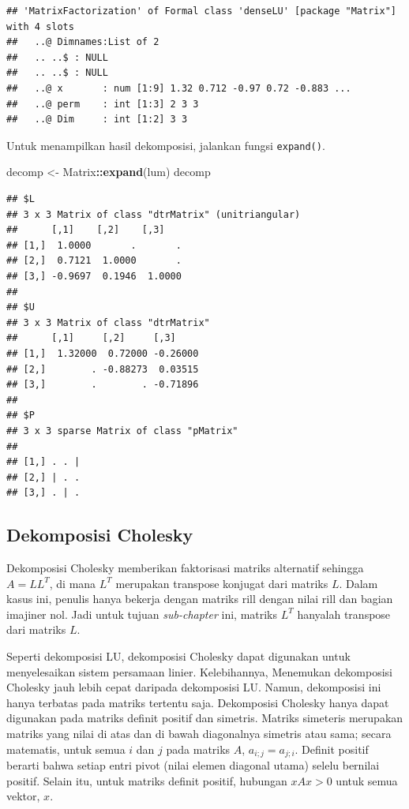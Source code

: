 \documentclass[
]{book}
\newenvironment{Shaded}{\begin{snugshade}}{\end{snugshade}}
\newcommand{\FunctionTok}[1]{\textcolor[rgb]{0.13,0.29,0.53}{\textbf{#1}}}
\newcommand{\NormalTok}[1]{#1}
\newcommand{\OtherTok}[1]{\textcolor[rgb]{0.56,0.35,0.01}{#1}}
\newcommand{\SpecialCharTok}[1]{\textcolor[rgb]{0.81,0.36,0.00}{\textbf{#1}}}
\theoremstyle{definition}
\theoremstyle{definition}
\theoremstyle{definition}
\theoremstyle{definition}
\theoremstyle{remark}
\begin{document}
\begin{verbatim}
## 'MatrixFactorization' of Formal class 'denseLU' [package "Matrix"] with 4 slots
##   ..@ Dimnames:List of 2
##   .. ..$ : NULL
##   .. ..$ : NULL
##   ..@ x       : num [1:9] 1.32 0.712 -0.97 0.72 -0.883 ...
##   ..@ perm    : int [1:3] 2 3 3
##   ..@ Dim     : int [1:2] 3 3
\end{verbatim}

Untuk menampilkan hasil dekomposisi, jalankan fungsi \texttt{expand()}.

\begin{Shaded}
\begin{Highlighting}[]
\NormalTok{decomp }\OtherTok{\textless{}{-}}\NormalTok{ Matrix}\SpecialCharTok{::}\FunctionTok{expand}\NormalTok{(lum)}
\NormalTok{decomp}
\end{Highlighting}
\end{Shaded}

\begin{verbatim}
## $L
## 3 x 3 Matrix of class "dtrMatrix" (unitriangular)
##      [,1]    [,2]    [,3]   
## [1,]  1.0000       .       .
## [2,]  0.7121  1.0000       .
## [3,] -0.9697  0.1946  1.0000
## 
## $U
## 3 x 3 Matrix of class "dtrMatrix"
##      [,1]     [,2]     [,3]    
## [1,]  1.32000  0.72000 -0.26000
## [2,]        . -0.88273  0.03515
## [3,]        .        . -0.71896
## 
## $P
## 3 x 3 sparse Matrix of class "pMatrix"
##           
## [1,] . . |
## [2,] | . .
## [3,] . | .
\end{verbatim}

\hypertarget{dekomposisi-cholesky}{%
\subsection{Dekomposisi Cholesky}\label{dekomposisi-cholesky}}

Dekomposisi Cholesky memberikan faktorisasi matriks alternatif sehingga \(A = LL^T\), di mana \(L^T\) merupakan transpose konjugat dari matriks \(L\). Dalam kasus ini, penulis hanya bekerja dengan matriks rill dengan nilai rill dan bagian imajiner nol. Jadi untuk tujuan \emph{sub-chapter} ini, matriks \(L^T\) hanyalah transpose dari matriks \(L\).

Seperti dekomposisi LU, dekomposisi Cholesky dapat digunakan untuk menyelesaikan sistem persamaan linier. Kelebihannya, Menemukan dekomposisi Cholesky jauh lebih cepat daripada dekomposisi LU. Namun, dekomposisi ini hanya terbatas pada matriks tertentu saja. Dekomposisi Cholesky hanya dapat digunakan pada matriks definit positif dan simetris. Matriks simeteris merupakan matriks yang nilai di atas dan di bawah diagonalnya simetris atau sama; secara matematis, untuk semua \(i\) dan \(j\) pada matriks \(A\), \(a_{i;j}=a_{j;i}\). Definit positif berarti bahwa setiap entri pivot (nilai elemen diagonal utama) selelu bernilai positif. Selain itu, untuk matriks definit positif, hubungan \(xAx>0\) untuk semua vektor, \(x\).
\end{document}

